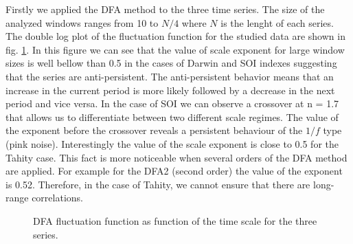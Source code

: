 \documentclass[onecolumn, preprint,aps,amsmath, amssymb, superscriptaddress]{revtex4}
\begin{document}

Firstly we applied the DFA method to the three time series. The size of the analyzed windows ranges from 10 to $N/4$ where $N$ is the lenght of each series. The double log plot of the fluctuation function for the studied data are shown in fig. \ref{fig:dfa}. In this figure we can see that the value of scale exponent for large window sizes is well bellow than 0.5 in the cases of Darwin and SOI indexes suggesting that the series are anti-persistent. The anti-persistent behavior means that an increase in the current period is more likely followed by a decrease in the next period and vice versa. In the case of SOI we can observe a crossover at n = 1.7 that allows us to differentiate between two different scale regimes. The value of the exponent before the crossover reveals a persistent behaviour of the $1/f$ type (pink noise). Interestingly the value of the scale exponent is close to 0.5 for the Tahity case. This fact is more noticeable when several orders of the DFA method are applied. For example for the DFA2 (second order) the value of the exponent is 0.52. Therefore, in the case of Tahity, we cannot ensure that there are long-range correlations. 

\begin{figure}
\caption{DFA fluctuation function as function of the time scale for the three series.}
\label{fig:dfa}
\end{figure}
\end{document}
